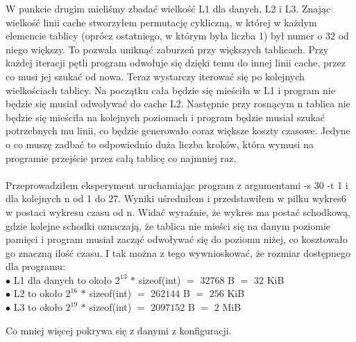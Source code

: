 \documentclass[a4paper]{article}
\begin{document}
W punkcie drugim mieliśmy zbadać wielkość L1 dla danych, L2 i L3. Znając wielkość linii cache stworzyłem permutację cykliczną, w której w każdym elemencie tablicy (oprócz ostatniego, w którym była liczba 1) był numer o 32 od niego większy. To pozwala uniknąć zaburzeń przy większych tablicach. Przy każdej iteracji pętli program odwołuje się dzięki temu do innej linii cache, przez co musi jej szukać od nowa. Teraz wystarczy iterować się po kolejnych wielkościach tablicy. Na początku cała będzie się mieściła w L1 i program nie będzie się musiał odwoływać do cache L2. Następnie przy rosnącym n tablica nie będzie się mieściła na kolejnych poziomach i program będzie musiał szukać potrzebnych mu linii, co będzie generowało coraz większe koszty czasowe. Jedyne o co muszę zadbać to odpowiednio duża liczba kroków, która wymusi na programie przejście przez całą tablicę co najmniej raz.\\\\
Przeprowadziłem eksperyment uruchamiając program z argumentami -s 30 -t 1 i dla kolejnych n od 1 do 27. Wyniki uśredniłem i przedstawiłem w pilku wykres6 w postaci wykresu czasu od n. Widać wyraźnie, że wykres ma postać schodkową, gdzie kolejne schodki oznaczają, że tablica nie mieści się na danym poziomie pamięci i program musiał zacząć odwoływać się do poziomu niżej, co kosztowało go znaczną ilość czasu. I tak można z tego wywnioskować, że rozmiar dostępnego dla programu:\\
$\bullet$ L1 dla danych to około $2^{13}$ $*$ sizeof(int) $=$ $32768$ B $=$ $32$ KiB\\
$\bullet$ L2 to około  $2^{16}$ $*$ sizeof(int) $=$ $262144$ B $=$ $256$ KiB\\
$\bullet$ L3 to około  $2^{19}$ $*$ sizeof(int) $=$ $2097152$ B $=$ $2$ MiB

Co mniej więcej pokrywa się z danymi z konfiguracji.

 
\end{document}

